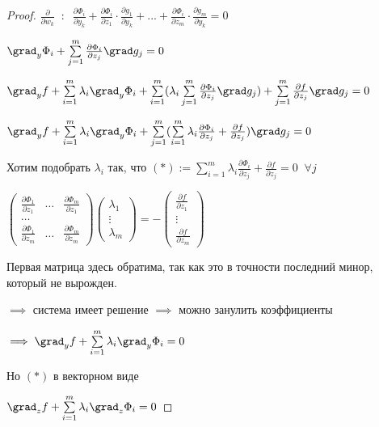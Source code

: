 \begin{proof}
	$\frac{\partial}{\partial w_k} \;\; : \;\; \frac{\partial \Phi_i}{\partial y_k} + \frac{\partial \Phi_i}{\partial z_1} \cdot \frac{\partial g_1}{\partial y_k} +...+ \frac{\partial \Phi_i}{\partial z_m} \cdot \frac{\partial g_m}{\partial y_k} = 0$

	$\grad_y \Phi_i + \sum\limits_{j = 1}^{m} \frac{\partial \Phi_i}{\partial z_j} \grad g_j = 0$
	
	$\grad_y f + \sum\limits_{i = 1}^{m} \lambda_i \grad_y \Phi_i + \sum\limits_{i = 1}^{m} (\lambda_i \sum\limits_{j = 1}^{m} \frac{\partial \Phi_i}{\partial z_j} \grad g_j)+ \sum\limits_{j =1}^{m} \frac{\partial f}{\partial z_j} \grad g_j = 0$
	
	$\grad_y f + \sum\limits_{i = 1}^{m} \lambda_i \grad_y \Phi_i + \sum\limits_{j =1}^{m} (\sum\limits_{i=1}^{m} \lambda_i \frac{\partial \Phi_i}{\partial z_j} + \frac{\partial f}{\partial z_j})\grad g_j = 0$
	
	Хотим подобрать $\lambda_i$ так, что $(*) := \sum\limits_{i=1}^{m} \lambda_i \frac{\partial \Phi_i}{\partial z_j} + \frac{\partial f}{\partial z_j}=0 \;\; \forall j $

	$\begin{pmatrix}
		\frac{\partial \Phi_1}{\partial z_1} & \dots & \frac{\partial \Phi_m}{\partial z_1}\\
		\dots\\
		\frac{\partial \Phi_1}{\partial z_m} &\dots&\frac{\partial \Phi_m}{\partial z_m}
	\end{pmatrix}\begin{pmatrix}
	\lambda_1\\ \vdots\\ \lambda_m
	\end{pmatrix} = -\begin{pmatrix}
	\frac{\partial f}{\partial z_1}\\
	\vdots\\
	\frac{\partial f}{\partial z_m}
	\end{pmatrix}$
	
	Первая матрица здесь обратима, так как это в точности последний минор, который не вырожден.
	
	$\implies$ система имеет решение $\implies $ можно занулить коэффициенты
	
	$\implies \grad_y f + \sum\limits_{i = 1}^{m} \lambda_i \grad_y \Phi_i = 0$
	
	Но $(*)$ в векторном виде
	
	$\grad_z f + \sum\limits_{i = 1}^{m} \lambda_i \grad_z \Phi_i = 0$
\end{proof}

